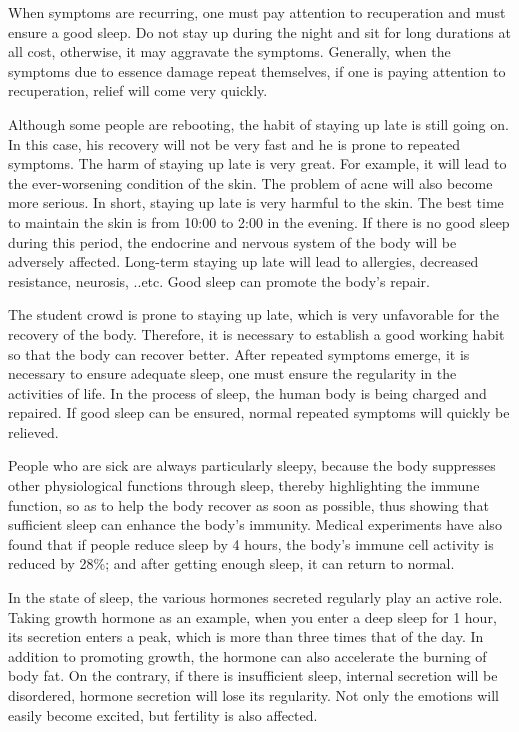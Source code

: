 \documentclass[
]{book}
\begin{document}
When symptoms are recurring, one must pay attention to recuperation and must ensure a good sleep. Do not stay up during the night and sit for long durations at all cost, otherwise, it may aggravate the symptoms. Generally, when the symptoms due to essence damage repeat themselves, if one is paying attention to recuperation, relief will come very quickly.

Although some people are rebooting, the habit of staying up late is still going on. In this case, his recovery will not be very fast and he is prone to repeated symptoms. The harm of staying up late is very great. For example, it will lead to the ever-worsening condition of the skin. The problem of acne will also become more serious. In short, staying up late is very harmful to the skin. The best time to maintain the skin is from 10:00 to 2:00 in the evening. If there is no good sleep during this period, the endocrine and nervous system of the body will be adversely affected. Long-term staying up late will lead to allergies, decreased resistance, neurosis, ..etc. Good sleep can promote the body's repair.

The student crowd is prone to staying up late, which is very unfavorable for the recovery of the body. Therefore, it is necessary to establish a good working habit so that the body can recover better. After repeated symptoms emerge, it is necessary to ensure adequate sleep, one must ensure the regularity in the activities of life. In the process of sleep, the human body is being charged and repaired. If good sleep can be ensured, normal repeated symptoms will quickly be relieved.

People who are sick are always particularly sleepy, because the body suppresses other physiological functions through sleep, thereby highlighting the immune function, so as to help the body recover as soon as possible, thus showing that sufficient sleep can enhance the body's immunity. Medical experiments have also found that if people reduce sleep by 4 hours, the body's immune cell activity is reduced by 28\%; and after getting enough sleep, it can return to normal.

In the state of sleep, the various hormones secreted regularly play an active role. Taking growth hormone as an example, when you enter a deep sleep for 1 hour, its secretion enters a peak, which is more than three times that of the day. In addition to promoting growth, the hormone can also accelerate the burning of body fat. On the contrary, if there is insufficient sleep, internal secretion will be disordered, hormone secretion will lose its regularity. Not only the emotions will easily become excited, but fertility is also affected.
\end{document}
